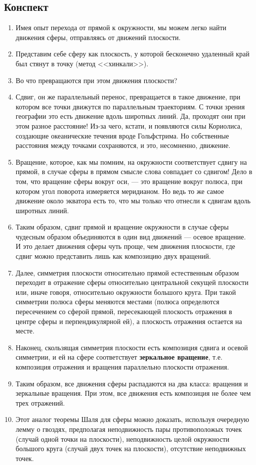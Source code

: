 \subsection{Конспект}
\begin{enumerate}
\item Имея опыт перехода от прямой к окружности, мы можем легко найти движения сферы, отправляясь от движений плоскости.
\item Представим себе сферу как плоскость, у которой бесконечно удаленный край был стянут в точку (метод <<хинкали>>).
\item Во что превращаются при этом движения плоскости?
\item Сдвиг, он же параллельный перенос, превращается в такое движение, при котором все точки движутся по параллельным траекториям. С точки зрения географии это есть движение вдоль широтных линий. Да, проходят они при этом разное расстояние! Из-за чего, кстати, и появляются силы Кориолиса, создающие океанические течения вроде Гольфстрима. Но собственные расстояния между точками сохраняются, и это, несомненно, движение.
\item Вращение, которое, как мы помним, на окружности соответствует сдвигу на прямой, в случае сферы в прямом смысле слова совпадает со сдвигом! Дело в том, что вращение сферы вокруг оси, --- это вращение вокруг полюса, при котором угол поворота измеряется меридианом. Но ведь то же самое движение около экватора есть то, что мы только что отнесли к сдвигам вдоль широтных линий.
\item Таким образом, сдвиг прямой и вращение окружности в случае сферы чудесным образом объединяются в один вид движений --- осевое вращение. И это делает движения сферы чуть проще, чем движения плоскости, где сдвиг можно представить лишь как композицию двух вращений.
\item Далее, симметрия плоскости относительно прямой естественным образом переходит в отражение сферы относительно центральной секущей плоскости или, иначе говоря, относительно окружности большого круга. При такой симметрии полюса сферы меняются местами (полюса определются пересечением со сферой прямой, пересекающей плоскость отражения в центре сферы и перпендикулярной ей), а плоскость отражения остается на месте.
\item Наконец, скользящая симметрия плоскости есть композиция сдвига и осевой симметрии, и ей на сфере соответствует \textbf{зеркальное вращение}, т.е. композиция отражения и вращения параллельно плоскости отражения.
\item Таким образом, все движения сферы распадаются на два класса: вращения и зеркальные вращения. При этом, все движения есть композиция не более чем трех отражений.
\item Этот аналог теоремы Шаля для сферы можно доказать, используя очередную лемму о гвоздях, предполагая неподвижность пары противоположых точек (случай одной точки на плоскости), неподвижность целой окружности большого круга (случай двух точек на плоскости), отсутствие неподвижных точек.
\end{enumerate}

